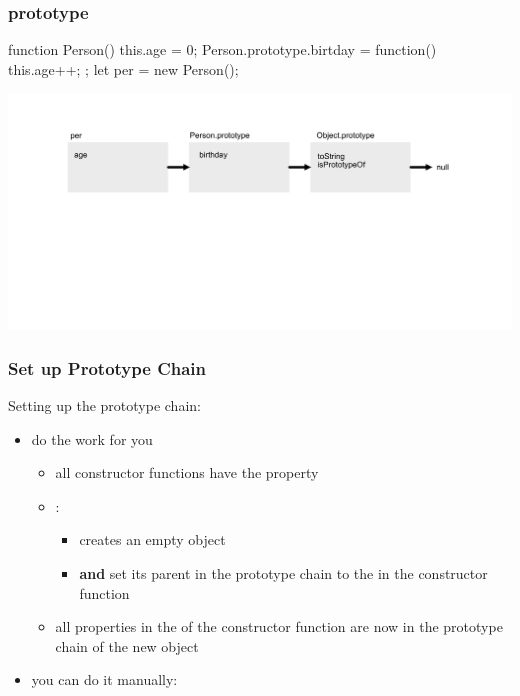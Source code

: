 \begin{frame}[fragile] \frametitle{prototype}
\begin{CodeBox}{}
function Person() {
  this.age = 0;
}
Person.prototype.birtday = function() { this.age++; };
let per = new Person();
\end{CodeBox}
  \centering
  \includegraphics[width=14cm]{img/prototype_chain3}
\end{frame}

\begin{frame}[fragile] \frametitle{Set up Prototype Chain}
Setting up the prototype chain:
\begin{itemize}
  \item {} do the work for you
  \begin{itemize}
    \item all constructor functions have the  property
    \item {}:
    \begin{itemize}
      \item creates an empty object
      \item {\bf and} set its parent in the prototype chain to the  in the constructor function
    \end{itemize}
    \item all properties in the  of the constructor function are now in the prototype chain of the new object
  \end{itemize}
  \item you can do it manually: 
\end{itemize}
\end{frame}

